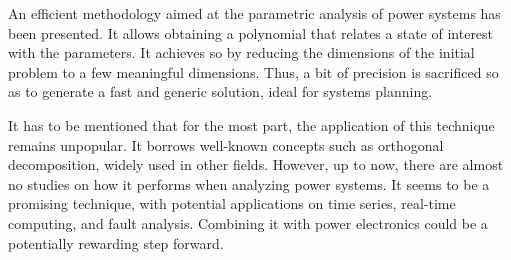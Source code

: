 An efficient methodology aimed at the parametric analysis of power systems has been presented. It allows obtaining a polynomial that relates a state of interest with the parameters. It achieves so by reducing the dimensions of the initial problem to a few meaningful dimensions. Thus, a bit of precision is sacrificed so as to generate a fast and generic solution, ideal for systems planning. 

It has to be mentioned that for the most part, the application of this technique remains unpopular. It borrows well-known concepts such as orthogonal decomposition, widely used in other fields. However, up to now, there are almost no studies on how it performs when analyzing power systems. It seems to be a promising technique, with potential applications on time series, real-time computing, and fault analysis. Combining it with power electronics could be a potentially rewarding step forward.  
